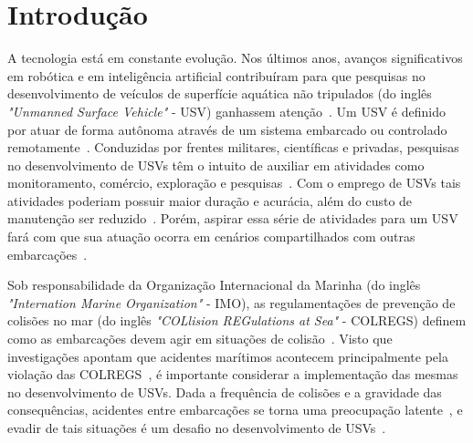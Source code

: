 


\chapter{Introdução}\label{chap1:intro}
    A tecnologia está em constante evolução. Nos últimos anos, avanços significativos em robótica e em inteligência artificial contribuíram para que pesquisas no desenvolvimento de veículos de superfície aquática não tripulados (do inglês \textit{"Unmanned Surface Vehicle"} - USV) ganhassem atenção~\cite{HUANG2020451}. Um USV é definido por atuar de forma autônoma através de um sistema embarcado ou controlado remotamente~\cite{SONG2018351}. Conduzidas por frentes militares, científicas e privadas, pesquisas no desenvolvimento de USVs têm o intuito de auxiliar em atividades como monitoramento, comércio, exploração e pesquisas~\cite{JURAK2020}. Com o emprego de USVs tais atividades poderiam possuir maior duração e acurácia, além do custo de manutenção ser reduzido~\cite{LIU201671}. Porém, aspirar essa série de atividades para um USV fará com que sua atuação ocorra em cenários compartilhados com outras embarcações~\cite{KUWATA2014110}.

    Sob responsabilidade da Organização Internacional da Marinha (do inglês \textit{"Internation Marine Organization"} - IMO), as regulamentações de prevenção de colisões no mar (do inglês \textit{"COLlision REGulations at Sea"} - COLREGS) definem como as embarcações devem agir em situações de colisão~\cite{JURAK2020}. Visto que investigações apontam que acidentes marítimos acontecem principalmente pela violação das COLREGS~\cite{SONG2018351}, é importante considerar a implementação das mesmas no desenvolvimento de USVs. Dada a frequência de colisões e a gravidade das consequências, acidentes entre embarcações se torna uma preocupação latente~\cite{HUANG2019142}, e evadir de tais situações é um desafio no desenvolvimento de USVs~\cite{JURAK2020}. 

